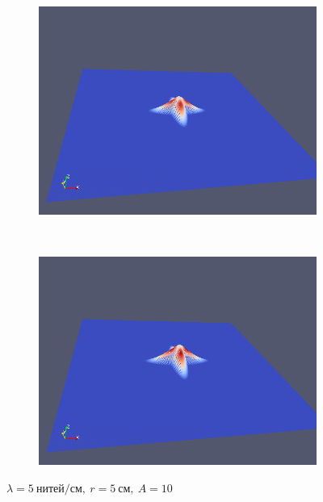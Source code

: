 \begin{figure}[H]
\begin{subfigure}[t]{0.5\textwidth}
        \includegraphics[width=\textwidth]{img/fiber/density_5_radius_5_amplitude_10/5.png}
    \end{subfigure}%
    ~
    \begin{subfigure}[t]{0.5\textwidth}
        \centering
        \includegraphics[width=\textwidth]{img/fiber/density_5_radius_5_amplitude_10/6.png}
    \end{subfigure}
    \caption{$\lambda=5~нитей/см,~r=5~см,~A=10$}
\end{figure}
